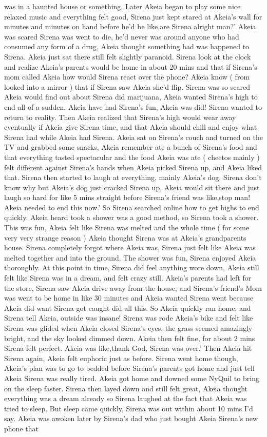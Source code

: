 \documentclass[12pt]{book}
\begin{document}
was in a haunted house or something. Later Akeia began to play some nice relaxed music and everything felt good, Sirena just kept stared at Akeia's wall for minutes and minutes on hand before he'd be like,are Sirena alright man?' Akeia was scared Sirena was went to die, he'd never was around anyone who had consumed any form of a drug, Akeia thought something bad was happened to Sirena. Akeia just sat there still felt slightly paranoid. Sirena look at the clock and realize Akeia's parents would be home in about 20 mins and that if Sirena's mom called Akeia how would Sirena react over the phone? Akeia know ( from looked into a mirror ) that if Sirena saw Akeia she'd flip. Sirena was so scared Akeia would find out about Sirena did marijuana, Akeia wanted Sirena's high to end all of a sudden. Akeia have had Sirena's fun, Akeia was did! Sirena wanted to return to reality. Then Akeia realized that Sirena's high would wear away eventually if Akeia give Sirena time, and that Akeia should chill and enjoy what Sirena had while Akeia had Sirena. Akeia sat on Sirena's couch and turned on the TV and grabbed some snacks, Akeia remember ate a bunch of Sirena's food and that everything tasted spectacular and the food Akeia was ate ( cheetos mainly ) felt different against Sirena's hands when Akeia picked Sirena up, and Akeia liked that. Sirena then started to laugh at everything, mainly Akeia's dog. Sirena don't know why but Akeia's dog just cracked Sirena up, Akeia would sit there and just laugh so hard for like 5 mins straight before Sirena's friend was like,stop man! Akeia needed to end this now.' So Sirena searched online how to get highs to end quickly. Akeia heard took a shower was a good method, so Sirena took a shower. This was fun, Akeia felt like Sirena was melted and the whole time ( for some very very strange reason ) Akeia thought Sirena was at Akeia's grandparents house. Sirena completely forgot where Akeia was, Sirena just felt like Akeia was melted together and into the ground. The shower was fun, Sirena enjoyed Akeia thoroughly. At this point in time, Sirena did feel anything wore down, Akeia still felt like Sirena was in a dream, and felt crazy still. Akeia's parents had left for the store, Sirena saw Akeia drive away from the house, and Sirena's friend's Mom was went to be home in like 30 minutes and Akeia wanted Sirena went because Akeia did want Sirena got caught did all this. So Akeia quickly ran home, and Sirena tell Akeia, outside was insane! Sirena was rode Akeia's bike and felt like Sirena was glided when Akeia closed Sirena's eyes, the grass seemed amazingly bright, and the sky looked dimmed down. Akeia then felt fine, for about 2 mins Sirena felt perfect. Akeia was like,thank God, Sirena was over.' Then Akeia hit Sirena again, Akeia felt euphoric just as before. Sirena went home though, Akeia's plan was to go to bedded before Sirena's parents got home and just tell Akeia Sirena was really tired. Akeia got home and downed some NyQuil to bring on the sleep faster. Sirena then layed down and still felt great, Akeia thought everything was a dream already so Sirena laughed at the fact that Akeia was tried to sleep. But sleep came quickly, Sirena was out within about 10 mins I'd say. Akeia was awoken later by Sirena's dad who just bought Akeia Sirena's new phone that 
\end{document}

